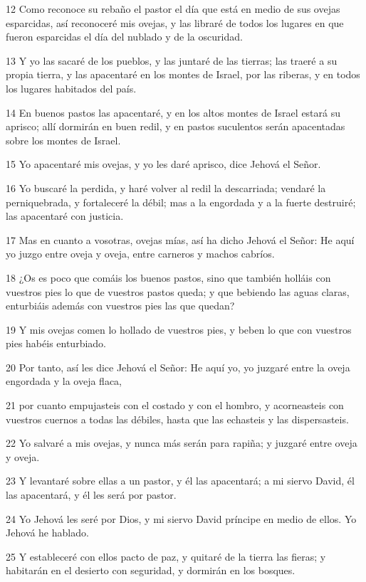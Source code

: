 \par 12 Como reconoce su rebaño el pastor el día que está en medio de sus ovejas esparcidas, así reconoceré mis ovejas, y las libraré de todos los lugares en que fueron esparcidas el día del nublado y de la oscuridad.
\par 13 Y yo las sacaré de los pueblos, y las juntaré de las tierras; las traeré a su propia tierra, y las apacentaré en los montes de Israel, por las riberas, y en todos los lugares habitados del país.
\par 14 En buenos pastos las apacentaré, y en los altos montes de Israel estará su aprisco; allí dormirán en buen redil, y en pastos suculentos serán apacentadas sobre los montes de Israel.
\par 15 Yo apacentaré mis ovejas, y yo les daré aprisco, dice Jehová el Señor.
\par 16 Yo buscaré la perdida, y haré volver al redil la descarriada; vendaré la perniquebrada, y fortaleceré la débil; mas a la engordada y a la fuerte destruiré; las apacentaré con justicia.
\par 17 Mas en cuanto a vosotras, ovejas mías, así ha dicho Jehová el Señor: He aquí yo juzgo entre oveja y oveja, entre carneros y machos cabríos.
\par 18 ¿Os es poco que comáis los buenos pastos, sino que también holláis con vuestros pies lo que de vuestros pastos queda; y que bebiendo las aguas claras, enturbiáis además con vuestros pies las que quedan?
\par 19 Y mis ovejas comen lo hollado de vuestros pies, y beben lo que con vuestros pies habéis enturbiado.
\par 20 Por tanto, así les dice Jehová el Señor: He aquí yo, yo juzgaré entre la oveja engordada y la oveja flaca,
\par 21 por cuanto empujasteis con el costado y con el hombro, y acorneasteis con vuestros cuernos a todas las débiles, hasta que las echasteis y las dispersasteis.
\par 22 Yo salvaré a mis ovejas, y nunca más serán para rapiña; y juzgaré entre oveja y oveja.
\par 23 Y levantaré sobre ellas a un pastor, y él las apacentará; a mi siervo David, él las apacentará, y él les será por pastor. 
\par 24 Yo Jehová les seré por Dios, y mi siervo David príncipe en medio de ellos. Yo Jehová he hablado.
\par 25 Y estableceré con ellos pacto de paz, y quitaré de la tierra las fieras; y habitarán en el desierto con seguridad, y dormirán en los bosques.

